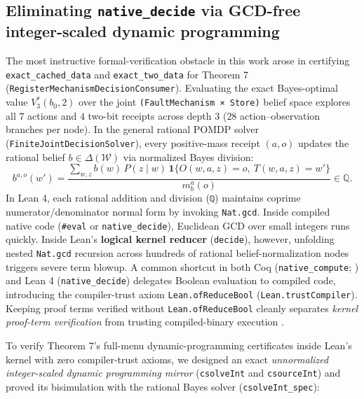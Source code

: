 \documentclass[11pt,a4paper]{article}
\begin{document}
\subsection{\texorpdfstring{Eliminating \texttt{native\_decide} via
GCD-free integer-scaled dynamic
programming}{Eliminating native\_decide via GCD-free integer-scaled dynamic programming}}\label{eliminating-native_decide-via-gcd-free-integer-scaled-dynamic-programming}

The most instructive formal-verification obstacle in this work arose in
certifying \texttt{exact\_cached\_data} and \texttt{exact\_two\_data}
for Theorem 7 (\texttt{RegisterMechanismDecisionConsumer}). Evaluating
the exact Bayes-optimal value \(V_3^*(b_0, 2)\) over the joint
\texttt{(FaultMechanism\ ×\ Store)} belief space explores all \(7\)
actions and \(4\) two-bit receipts across depth \(3\) (\(28\)
action--observation branches per node). In the general rational POMDP
solver (\texttt{FiniteJointDecisionSolver}), every positive-mass receipt
\((a, o)\) updates the rational belief \(b \in \Delta(\mathcal{W})\) via
normalized Bayes division:
\[b^{a,o}(w') = \frac{\sum_{w,z} b(w)\, P(z \mid w)\, \mathbf{1}\{O(w,a,z)=o,\ T(w,a,z)=w'\}}{m_b^a(o)} \in \mathbb{Q}.\]
In Lean 4, each rational addition and division (\texttt{ℚ}) maintains
coprime numerator/denominator normal form by invoking \texttt{Nat.gcd}.
Inside compiled native code (\texttt{\#eval} or
\texttt{native\_decide}), Euclidean GCD over small integers runs
quickly. Inside Lean's \textbf{logical kernel reducer}
(\texttt{decide}), however, unfolding nested \texttt{Nat.gcd} recursion
across hundreds of rational belief-normalization nodes triggers severe
term blowup. A common shortcut in both Coq (\texttt{native\_compute};
\citet{boespflug2011}) and Lean 4 (\texttt{native\_decide}) delegates
Boolean evaluation to compiled code, introducing the compiler-trust
axiom \texttt{Lean.ofReduceBool} (\texttt{Lean.trustCompiler}). Keeping
proof terms verified without \texttt{Lean.ofReduceBool} cleanly
separates \emph{kernel proof-term verification} from trusting
compiled-binary execution \citep{mouraUllrich2021, carneiro2019}.

To verify Theorem 7's full-menu dynamic-programming certificates inside
Lean's kernel with zero compiler-trust axioms, we designed an exact
\emph{unnormalized integer-scaled dynamic programming mirror}
(\texttt{csolveInt} and \texttt{csourceInt}) and proved its bisimulation
with the rational Bayes solver (\texttt{csolveInt\_spec}):
\end{document}
